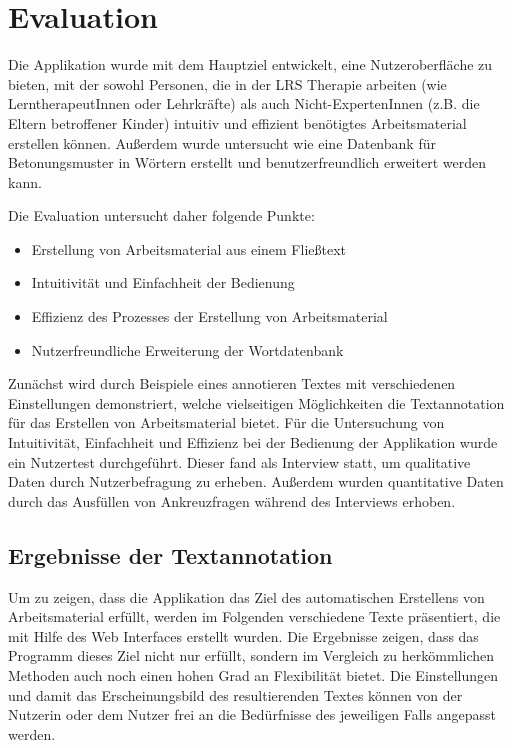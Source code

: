
\chapter{Evaluation}

Die Applikation wurde mit dem Hauptziel entwickelt, eine Nutzeroberfläche zu bieten, mit der sowohl Personen, die in der LRS Therapie arbeiten (wie LerntherapeutInnen oder Lehrkräfte) als auch Nicht-ExpertenInnen (z.B. die Eltern betroffener Kinder) intuitiv und effizient benötigtes Arbeitsmaterial erstellen können. Außerdem wurde untersucht wie eine Datenbank für Betonungsmuster in Wörtern erstellt und benutzerfreundlich erweitert werden kann.

Die Evaluation untersucht daher folgende Punkte:
\begin{itemize}
	\item Erstellung von Arbeitsmaterial aus einem Fließtext
	\item Intuitivität und Einfachheit der Bedienung
	\item Effizienz des Prozesses der Erstellung von Arbeitsmaterial
	\item Nutzerfreundliche Erweiterung der Wortdatenbank
\end{itemize}

Zunächst wird durch Beispiele eines annotieren Textes mit verschiedenen Einstellungen demonstriert, welche vielseitigen Möglichkeiten die Textannotation für das Erstellen von Arbeitsmaterial bietet. Für die Untersuchung von Intuitivität, Einfachheit und Effizienz bei der Bedienung der Applikation wurde ein Nutzertest durchgeführt. Dieser fand als Interview statt, um qualitative Daten durch Nutzerbefragung zu erheben. Außerdem wurden quantitative Daten durch das Ausfüllen von Ankreuzfragen während des Interviews erhoben.

\section{Ergebnisse der Textannotation}
\label{sec:annotation-results}

Um zu zeigen, dass die Applikation das Ziel des automatischen Erstellens von Arbeitsmaterial erfüllt, werden im Folgenden verschiedene Texte präsentiert, die mit Hilfe des Web Interfaces erstellt wurden. Die Ergebnisse zeigen, dass das Programm dieses Ziel nicht nur erfüllt, sondern im Vergleich zu herkömmlichen Methoden auch noch einen hohen Grad an Flexibilität bietet. Die Einstellungen und damit das Erscheinungsbild des resultierenden Textes können von der Nutzerin oder dem Nutzer frei an die Bedürfnisse des jeweiligen Falls angepasst werden.

